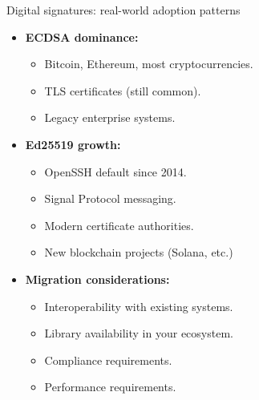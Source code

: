 \documentclass[aspectratio=169, lualatex, handout]{beamer}
\begin{document}
\begin{frame}{Digital signatures: real-world adoption patterns}
	\begin{itemize}
		\item \textbf{ECDSA dominance:}
		      \begin{itemize}
			      \item Bitcoin, Ethereum, most cryptocurrencies.
			      \item TLS certificates (still common).
			      \item Legacy enterprise systems.
		      \end{itemize}
		\item \textbf{Ed25519 growth:}
		      \begin{itemize}
			      \item OpenSSH default since 2014.
			      \item Signal Protocol messaging.
			      \item Modern certificate authorities.
			      \item New blockchain projects (Solana, etc.)
		      \end{itemize}
		\item \textbf{Migration considerations:}
		      \begin{itemize}
			      \item Interoperability with existing systems.
			      \item Library availability in your ecosystem.
			      \item Compliance requirements.
			      \item Performance requirements.
		      \end{itemize}
	\end{itemize}
\end{frame}
\end{document}

